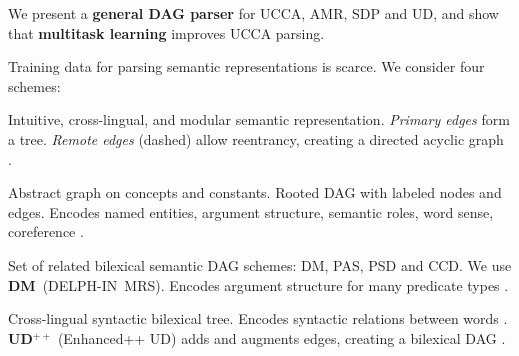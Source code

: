 \documentclass[a0,portrait]{a0poster}
\begin{document}
\vspace{1cm}
\titlespacing*{\section}{0pt}{8mm}{5mm}



\begin{adjustbox}{margin=5mm,frame,minipage=.51\linewidth,center}
\Large\color{Navy}
We present a \textbf{general DAG parser} for UCCA, AMR, SDP and UD,
and show that \textbf{multitask learning} improves UCCA parsing.
\end{adjustbox}


\begin{multicols}{2}


\color{Black}

Training data for parsing semantic representations is scarce.
We consider four schemes:
\begin{itemize}[labelsep=1em]
{\color{Indigo} \item[\textbf{UCCA}:] Intuitive, cross-lingual, and modular semantic representation.
    \textit{Primary edges} form a tree. \textit{Remote edges} (dashed) allow reentrancy,
    creating a directed acyclic graph \cite{abend2013universal}.}
{\color{DarkGreen} \item[\textbf{AMR}:] Abstract graph on concepts and constants.
    Rooted DAG with labeled nodes and edges.
    Encodes named entities, argument structure, semantic roles, word sense, coreference \cite{banarescu2013abstract}.}
{\color{DarkRed} \item[\textbf{SDP}:] Set of related bilexical semantic DAG schemes: DM, PAS, PSD and CCD.
    We use \textbf{DM}~(DELPH-IN~MRS).
    Encodes argument structure for many predicate types \cite{oepen2016towards}.}
{\color{DarkBlue} \item[\textbf{UD}:] Cross-lingual syntactic bilexical tree.
    Encodes syntactic relations between words \cite{nivre2016universal}. \\
    \textbf{UD$^{++}$} (Enhanced++ UD) adds and augments edges, creating a bilexical DAG
    \cite{SCHUSTER16.779}.}
\end{itemize}


\end{multicols}
\end{document}
